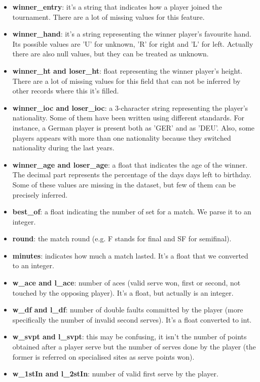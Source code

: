 \begin{itemize}
    \item \textbf{winner\_entry}: it's a string that indicates how a player joined the tournament. There are a lot of missing values for this feature.
    \item \textbf{winner\_hand}: it's a string representing the winner player's favourite hand. Its possible values are 'U' for unknown, 'R' for right and 'L' for left. Actually there are also null values, but they can be treated as unknown.
    \item \textbf{winner\_ht and loser\_ht}: float representing the winner player's height. There are a lot of missing values for this field that can not be inferred by other records where this it's filled.
    \item \textbf{winner\_ioc and loser\_ioc}: a 3-character string representing the player's nationality. Some of them have been written using different standards. For instance, a German player is present both as 'GER' and as 'DEU'. Also, some players appears with more than one nationality because they switched nationality during the last years.
    \item \textbf{winner\_age and loser\_age}: a float that indicates the age of the winner. The decimal part represents the percentage of the days days left to birthday. Some of these values are missing in the dataset, but few of them can be precisely inferred.
    \item \textbf{best\_of}: a float indicating the number of set for a match. We parse it to an integer.
    \item \textbf{round}: the match round (e.g. F stands for final and SF for semifinal).
    \item \textbf{minutes}: indicates how much a match lasted. It's a float that we converted to an integer.
    \item \textbf{w\_ace and l\_ace}: number of aces (valid serve won, first or second, not touched by the opposing player). It's a float, but actually is an integer.
    \item \textbf{w\_df and l\_df}: number of double faults committed by the player (more specifically the number of invalid second serves). It's a float converted to int.
    \item \textbf{w\_svpt and l\_svpt}: this may be confusing, it isn't the number of points obtained after a player serve but the number of serves done by the player (the former is referred on specialised sites as serve points won).
    \item \textbf{w\_1stIn and l\_2stIn}: number of valid first serve by the player.

\end{itemize}
